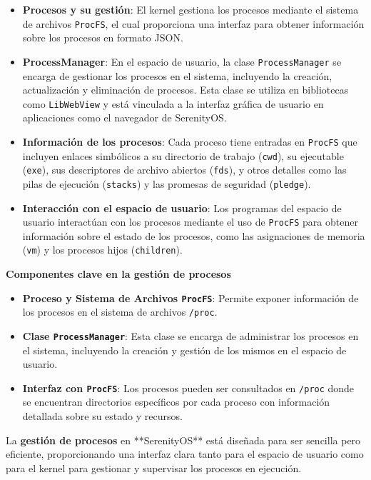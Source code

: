 \begin{itemize}
  \item \textbf{Procesos y su gestión}: El kernel gestiona los procesos mediante el sistema de archivos \texttt{ProcFS}, el cual proporciona una interfaz para obtener información sobre los procesos en formato JSON.
  \item \textbf{ProcessManager}: En el espacio de usuario, la clase \texttt{ProcessManager} se encarga de gestionar los procesos en el sistema, incluyendo la creación, actualización y eliminación de procesos. Esta clase se utiliza en bibliotecas como \texttt{LibWebView} y está vinculada a la interfaz gráfica de usuario en aplicaciones como el navegador de SerenityOS.
  \item \textbf{Información de los procesos}: Cada proceso tiene entradas en \texttt{ProcFS} que incluyen enlaces simbólicos a su directorio de trabajo (\texttt{cwd}), su ejecutable (\texttt{exe}), sus descriptores de archivo abiertos (\texttt{fds}), y otros detalles como las pilas de ejecución (\texttt{stacks}) y las promesas de seguridad (\texttt{pledge}).
  \item \textbf{Interacción con el espacio de usuario}: Los programas del espacio de usuario interactúan con los procesos mediante el uso de \texttt{ProcFS} para obtener información sobre el estado de los procesos, como las asignaciones de memoria (\texttt{vm}) y los procesos hijos (\texttt{children}).
\end{itemize}

\textbf{Componentes clave en la gestión de procesos}

\begin{itemize}
  \item \textbf{Proceso y Sistema de Archivos \texttt{ProcFS}}: Permite exponer información de los procesos en el sistema de archivos \texttt{/proc}.
  \item \textbf{Clase \texttt{ProcessManager}}: Esta clase se encarga de administrar los procesos en el sistema, incluyendo la creación y gestión de los mismos en el espacio de usuario.
  \item \textbf{Interfaz con \texttt{ProcFS}}: Los procesos pueden ser consultados en \texttt{/proc} donde se encuentran directorios específicos por cada proceso con información detallada sobre su estado y recursos.
\end{itemize}

La \textbf{gestión de procesos} en **SerenityOS** está diseñada para ser sencilla pero eficiente, proporcionando una interfaz clara tanto para el espacio de usuario como para el kernel para gestionar y supervisar los procesos en ejecución.

